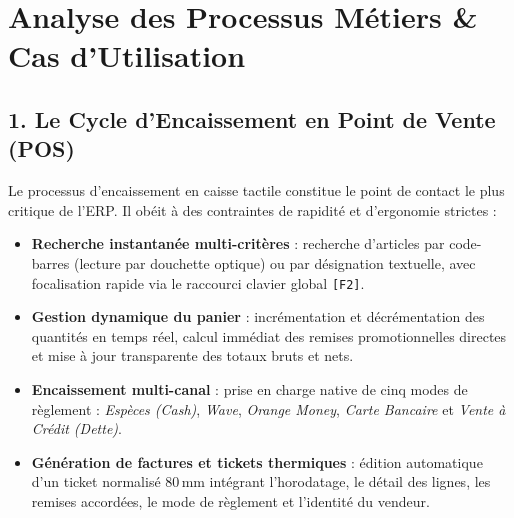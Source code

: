 \documentclass[11pt,a4paper,titlepage,twoside,openright]{report}
\begin{document}
\section{Analyse des Processus Métiers \& Cas d'Utilisation}

\subsection{1. Le Cycle d'Encaissement en Point de Vente (POS)}
Le processus d'encaissement en caisse tactile constitue le point de contact le plus critique de l'ERP. Il obéit à des contraintes de rapidité et d'ergonomie strictes :
\begin{itemize}
    \item \textbf{Recherche instantanée multi-critères} : recherche d'articles par code-barres (lecture par douchette optique) ou par désignation textuelle, avec focalisation rapide via le raccourci clavier global \texttt{[F2]}.
    \item \textbf{Gestion dynamique du panier} : incrémentation et décrémentation des quantités en temps réel, calcul immédiat des remises promotionnelles directes et mise à jour transparente des totaux bruts et nets.
    \item \textbf{Encaissement multi-canal} : prise en charge native de cinq modes de règlement : \emph{Espèces (Cash)}, \emph{Wave}, \emph{Orange Money}, \emph{Carte Bancaire} et \emph{Vente à Crédit (Dette)}.
    \item \textbf{Génération de factures et tickets thermiques} : édition automatique d'un ticket normalisé 80\,mm intégrant l'horodatage, le détail des lignes, les remises accordées, le mode de règlement et l'identité du vendeur.
\end{itemize}
\end{document}
